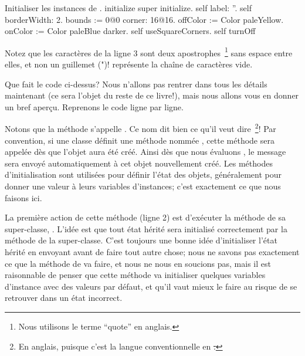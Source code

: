 \documentclass[a4paper,10pt,twoside]{book}
\begin{document}
\begin{numMethod}[scbecellinitialize]{Initialiser les instances de .}
initialize
   super initialize.
   self label: ''.
   self borderWidth: 2.
   bounds := 0@0 corner: 16@16.
   offColor := Color paleYellow.
   onColor := Color paleBlue darker.
   self useSquareCorners.
   self turnOff
\end{numMethod}

\noindent
Notez que les caractères  de la ligne 3 sont deux
apostrophes~\footnote{Nous utilisons le terme ``quote'' en anglais.} 
sans espace entre elles, et non un guillemet (")!
 représente la chaîne de caractères vide.


Que fait le code ci-dessus?  Nous n'allons pas rentrer dans tous les
détails maintenant (ce sera l'objet du reste de ce livre!), mais nous
allons vous en donner un bref aperçu. Reprenons le code ligne par ligne.

Notons que la méthode s'appelle .
Ce nom dit bien ce qu'il veut dire~\footnote{En anglais, puisque c'est
  la langue conventionnelle en \st.}!
Par convention, si une classe définit une méthode nommée
, cette méthode sera appelée dès que l'objet aura été créé.
Ainsi dès que nous évaluons , le message  sera envoyé automatiquement à cet objet nouvellement créé.
Les méthodes d'initialisation sont utilisées pour définir l'état des objets, généralement pour donner une valeur à leurs variables d'instances; c'est exactement ce que nous faisons ici.

La première action de cette méthode (ligne 2) est d'exécuter la méthode  de sa super-classe, .
L'idée est que tout état hérité sera initialisé correctement par la méthode  de la super-classe.
C'est toujours une bonne idée d'initialiser l'état hérité en envoyant
 avant de faire tout autre chose; nous ne savons
pas exactement ce que la méthode  de
 va faire, et nous ne nous en soucions pas, mais
il est raisonnable de penser que cette méthode va initialiser quelques
variables d'instance avec des valeurs par défaut, et qu'il vaut mieux
le faire au risque de se retrouver dans un état incorrect.
\end{document}
